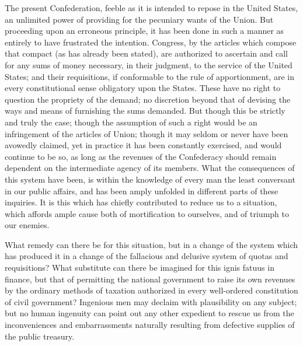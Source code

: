 The present Confederation, feeble as it is intended to repose in the United States, an unlimited power of providing for the pecuniary wants of the Union. 
But proceeding upon an erroneous principle, it has been done in such a manner as entirely to have frustrated the intention. 
Congress, by the articles which compose that compact (as has already been stated), are authorized to ascertain and call for any sums of money necessary, in their judgment, to the service of the United States; and their requisitions, if conformable to the rule of apportionment, are in every constitutional sense obligatory upon the States. 
These have no right to question the propriety of the demand; no discretion beyond that of devising the ways and means of furnishing the sums demanded. 
But though this be strictly and truly the case; though the assumption of such a right would be an infringement of the articles of Union; though it may seldom or never have been avowedly claimed, yet in practice it has been constantly exercised, and would continue to be so, as long as the revenues of the Confederacy should remain dependent on the intermediate agency of its members. 
What the consequences of this system have been, is within the knowledge of every man the least conversant in our public affairs, and has been amply unfolded in different parts of these inquiries. 
It is this which has chiefly contributed to reduce us to a situation, which affords ample cause both of mortification to ourselves, and of triumph to our enemies.

What remedy can there be for this situation, but in a change of the system which has produced it in a change of the fallacious and delusive system of quotas and requisitions? 
What substitute can there be imagined for this ignis fatuus in finance, but that of permitting the national government to raise its own revenues by the ordinary methods of taxation authorized in every well-ordered constitution of civil government? 
Ingenious men may declaim with plausibility on any subject; but no human ingenuity can point out any other expedient to rescue us from the inconveniences and embarrassments naturally resulting from defective supplies of the public treasury.

